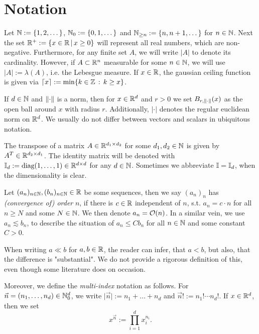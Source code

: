
\section{Notation}

Let $\mathbb{N} := \{1, 2, \dots \}$, $\mathbb{N}_0 := \{0, 1, \dots\}$ and $\mathbb{N}_{\geq n} := \{n, n+1, \dots \}$ for $n \in \mathbb{N}$. 
Next the set $\mathbb{R}^+:= \{x \in \mathbb{R} \, \vert \, x \geq 0 \}$ will represent all real numbers, which are non-negative.
Furthermore, for any finite set $A$, we will
write $\vert A \vert$ to denote its cardinality. However, if $A \subset \mathbb{R}^n$ measurable for some $n \in \mathbb{N}$, 
we will use $\vert A \vert := \lambda(A)$, i.e. the Lebesgue measure. 
If $x \in \mathbb{R}$, the gaussian ceiling function is given via
$\left\lceil x\right\rceil := \min\{k \in \mathbb{Z} \, : \, k \geq x\}$.

If $d \in \mathbb{N}$ and $\lVert \cdot \rVert$ is a norm, then for $x \in \mathbb{R}^d$ and $r>0$ we set 
$B_{r, \lVert \cdot \rVert}(x)$ as the open ball around $x$ with radius $r$. Additionally, $\vert \cdot \vert$ denotes
the regular euclidean norm on $\mathbb{R}^d$. We usually do not differ between vectors and scalars in ubiquitous notation.

The transpose of a matrix $A \in \mathbb{R}^{d_1 \times d_2}$ for some $d_1, d_2 \in \mathbb{N}$ is given by
$A^T \in \mathbb{R}^{d_2 \times d_1}$. The identity matrix will be denoted with 
$\mathbb{I}_d := \text{diag}(1, \dots, 1) \in \mathbb{R}^{d \times d}$
for any $d \in \mathbb{N}$. Sometimes we abbreviate $\mathbb{I} = \mathbb{I}_d$, when the dimensionality is clear.

Let $(a_n)_{n \in \mathbb{N}}, (b_n)_{n \in \mathbb{N}} \in \mathbb{R}$ be some sequences, then we say $(a_n)_n$ has \emph{(convergence of) order} $n$,
if there is $c \in \mathbb{R}$ independent of $n$, s.t. $a_n = c \cdot n$ for all $n \geq N$ and some $N \in \mathbb{N}$. 
We then denote $a_n = \mathcal{O}(n)$.
In a similar vein, we use $a_n \lesssim b_n$, to describe the situation of $a_n \leq C b_n$ 
for all $n \in \mathbb{N}$ and some constant $C > 0$.

When writing $a \ll b$ for $a, b \in \mathbb{R}$, the reader can infer, that $a < b$, but also, that the difference 
is "substantial".
We do not provide a rigorous definition of this, even though some literature does on occasion.

Moreover, we define the \emph{multi-index} notation as follows. For ${\vec{n}} = (n_1, \dots, n_d) 
\in \mathbb{N}_0^d$, we write $\vert {\vec{n}} \vert := n_1 + \dots + n_d$
and ${\vec{n}}! := n_1! \cdots n_d!$. If $x \in \mathbb{R}^d$, then we set
\begin{equation*}
    x^{\vec{n}} := \prod_{i=1}^d x_i^{n_i}.
\end{equation*}

